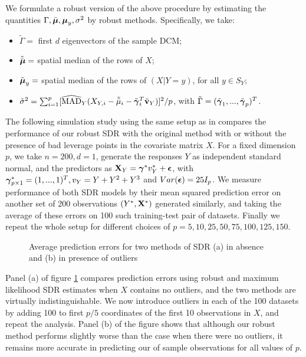 We formulate a robust version of the above procedure by estimating the quantities $\Gamma, \bar{{\boldsymbol{\mu}}}, {\boldsymbol{\mu}}_y, \sigma^2$ by robust methods. Specifically, we take:
%
\begin{itemize}
\item $\tilde \Gamma = $ first $d$ eigenvectors of the sample DCM;
%
\item $\tilde{\bar{{\boldsymbol{\mu}}}} = $ spatial median of the rows of $X$;
%
\item $\tilde {{\boldsymbol{\mu}}}_y = $ spatial median of the rows of $(X|Y=y)$, for all $y \in S_Y$;
%
\item $\tilde\sigma^2 = \sum_{i=1}^p [\widehat{\text{MAD}}_Y (X_{Y,i} - \tilde{\bar\mu}_i - \tilde{{\boldsymbol{\gamma}}}_i^T \tilde{{\bf{v}}}_Y)]^2/p$, with $\tilde\Gamma = (\tilde{{\boldsymbol{\gamma}}}_1, ..., \tilde{{\boldsymbol{\gamma}}}_p)^T$.
\end{itemize}
%
The following simulation study using the same setup as in \citep{AdragniCook09} compares the performance of our robust SDR with the original method with or without the presence of bad leverage points in the covariate matrix $X$. For a fixed dimension $p$, we take $n=200, d=1$, generate the responses $Y$ as independent standard normal, and the predictors as ${\mathbf{X}}_Y = {\boldsymbol{\gamma}}^* v_Y^* + {\boldsymbol{\epsilon}}$, with ${\boldsymbol{\gamma}}^*_{p\times 1} = (1,...,1)^T, v_Y = Y + Y^2 + Y^3$ and $Var({\boldsymbol{\epsilon}}) = 25 I_p$. We measure performance of both SDR models by their mean squared prediction error on another set of 200 observations $(Y^*, {\mathbf{X}}^*)$ generated similarly, and taking the average of these errors on 100 such training-test pair of datasets. Finally we repeat the whole setup for different choices of $p = 5,10,25,50,75,100,125,150$.

\begin{figure}[t]
\begin{center}
\caption{Average prediction errors for two methods of SDR (a) in absence and (b) in presence of outliers}
\label{fig:SDRfig}
\end{center}
\end{figure}

Panel (a) of figure \ref{fig:SDRfig} compares prediction errors using robust and maximum likelihood SDR estimates when $X$ contains no outliers, and the two methods are virtually indistinguishable. We now introduce outliers in each of the 100 datasets by adding 100 to first $p/5$ coordinates of the first 10 observations in $X$, and repeat the analysis. Panel (b) of the figure shows that although our robust method performs slightly worse than the case when there were no outliers, it remains more accurate in predicting our of sample observations for all values of $p$. 


